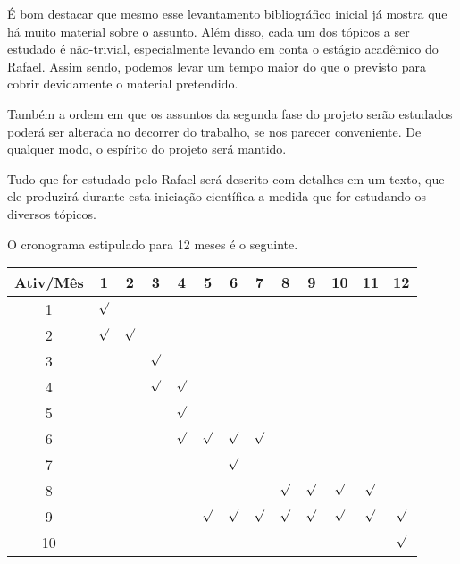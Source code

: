 \documentclass[12pt]{article}
\begin{document}

É bom destacar que mesmo esse levantamento bibliográfico inicial já
mostra que há muito material sobre o assunto. Além disso, cada um dos
tópicos a ser estudado é não-trivial, especialmente levando em conta o
estágio acadêmico do Rafael. Assim sendo, podemos levar um tempo maior
do que o previsto para cobrir devidamente o material pretendido.


Também a ordem em que os assuntos da segunda fase do projeto serão
estudados poderá ser alterada no decorrer do trabalho, se nos parecer
conveniente. De qualquer modo, o espírito do projeto será mantido.


Tudo que for estudado pelo Rafael será descrito com detalhes em um
texto, que ele produzirá durante esta iniciação científica a medida
que for estudando os diversos tópicos. 


O cronograma estipulado para 12 meses é o seguinte. 

\begin{center}
\noindent
\begin{tabular}{|c|c|c|c|c|c|c|c|c|c|c|c|c|}\hline
Ativ/Mês & 1 & 2 & 3 & 4 & 5 & 6 & 7 & 8 & 9 & 10 & 11 & 12 \\ \hline
1 & $\surd$ &         & & & & & & & & & & \\
2 & $\surd$ & $\surd$ & & & & & & & & & & \\
3 &         &         & $\surd$ & & & & & & & & & \\
4 &         &         & $\surd$ & $\surd$ & & & & & & & & \\
5 &         &         &         & $\surd$ & & & & & & & & \\
6 &         &         &         & $\surd$ & $\surd$ & $\surd$ & $\surd$ & & & & & \\
7 &         &         &         &         &         & $\surd$ & & & & & & \\
8 &         &         &         &         &         &         &         & $\surd$ & $\surd$ & $\surd$ & $\surd$ & \\
9 &         &         &         &         & $\surd$ & $\surd$ & $\surd$ & $\surd$ & $\surd$ & $\surd$ & $\surd$ & $\surd$ \\
10 &         &         &         &         &         & & & & & & & $\surd$ \\ \hline
\end{tabular}
\end{center}
\end{document}
